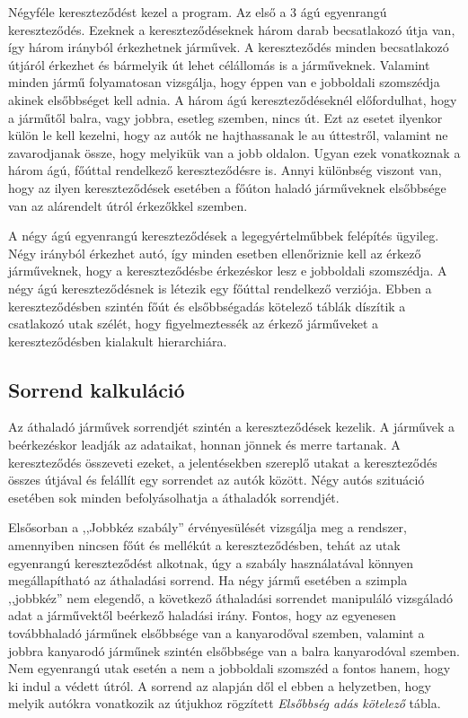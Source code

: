 \documentclass[
]{thesis-ekf}
\theoremstyle{definition}
\theoremstyle{remark}
\begin{document}
Négyféle kereszteződést kezel a program. Az első a 3 ágú egyenrangú kereszteződés. Ezeknek a kereszteződéseknek három darab becsatlakozó útja van, így három irányból érkezhetnek járművek. A kereszteződés minden becsatlakozó útjáról érkezhet és bármelyik út lehet célállomás is a járműveknek. Valamint minden jármű folyamatosan vizsgálja, hogy éppen van e jobboldali szomszédja akinek elsőbbséget kell adnia. A három ágú kereszteződéseknél előfordulhat, hogy a járműtől balra, vagy jobbra, esetleg szemben, nincs út. Ezt az esetet ilyenkor külön le kell kezelni, hogy az autók ne hajthassanak le au úttestről, valamint ne zavarodjanak össze, hogy melyikük van a jobb oldalon. Ugyan ezek vonatkoznak a három ágú, főúttal rendelkező kereszteződésre is. Annyi különbség viszont van, hogy az ilyen kereszteződések esetében a főúton haladó járműveknek elsőbbsége van az alárendelt útról érkezőkkel szemben.

A négy ágú egyenrangú kereszteződések a legegyértelműbbek felépítés ügyileg. Négy irányból érkezhet autó, így minden esetben ellenőriznie kell az érkező járműveknek, hogy a kereszteződésbe érkezéskor lesz e jobboldali szomszédja. A négy ágú kereszteződésnek is létezik egy főúttal rendelkező verziója. Ebben a kereszteződésben szintén főút és elsőbbségadás kötelező táblák díszítik a csatlakozó utak szélét, hogy figyelmeztessék az érkező járműveket a kereszteződésben kialakult hierarchiára.
\subsection{Sorrend kalkuláció}
Az áthaladó járművek sorrendjét szintén a kereszteződések kezelik. A járművek a beérkezéskor leadják az adataikat, honnan jönnek és merre tartanak. A kereszteződés összeveti ezeket, a jelentésekben szereplő utakat a kereszteződés összes útjával és felállít egy sorrendet az autók között. Négy autós szituáció esetében sok minden befolyásolhatja a áthaladók sorrendjét.

Elsősorban a ,,Jobbkéz szabály'' érvényesülését vizsgálja meg a rendszer, amennyiben nincsen főút és mellékút a kereszteződésben, tehát az utak egyenrangú kereszteződést alkotnak, úgy a szabály használatával könnyen megállapítható az áthaladási sorrend. Ha négy jármű esetében a szimpla ,,jobbkéz'' nem elegendő, a következő áthaladási sorrendet manipuláló vizsgáladó adat a járművektől beérkező haladási irány. Fontos, hogy az egyenesen továbbhaladó járműnek elsőbbsége van a kanyarodőval szemben, valamint a jobbra kanyarodó járműnek szintén elsőbbsége van a balra kanyarodóval szemben. Nem egyenrangú utak esetén a nem a jobboldali szomszéd a fontos hanem, hogy ki indul a védett útról. A sorrend az alapján dől el ebben a helyzetben, hogy melyik autókra vonatkozik az útjukhoz rögzített \textit{Elsőbbség adás kötelező} tábla. 
\end{document}
